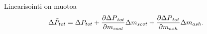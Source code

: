 Linearisointi on muotoa
\begin{align}
    \begin{split}
    \Delta\tilde{ P}_{tot} &= \Delta P_{tot}
    +
    \frac{\partial {\Delta P}_{tot}}{\partial m_{soot}} \Delta m_{soot}
    + 
    \frac{\partial {\Delta P}_{tot}}{\partial m_{ash}}  \Delta m_{ash}.
\end{split}
\end{align}





